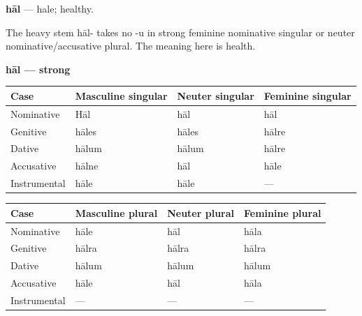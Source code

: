 \par\begin{minipage}{\linewidth}\raggedright
\textbf{hāl} — hale; healthy.

The heavy stem hāl- takes no -u in strong feminine nominative singular or neuter nominative/\allowbreak{}accusative plural. The meaning here is health.

\textbf{hāl — strong}

\par\begingroup
\fontsize{10.5}{13.2}\selectfont
\setlength{\LTleft}{0pt}\setlength{\LTright}{\fill}
\noindent
\begin{tabular}{@{}>{\raggedright\arraybackslash}p{22.0mm}>{\raggedright\arraybackslash}p{31.188mm}>{\raggedright\arraybackslash}p{31.188mm}>{\raggedright\arraybackslash}p{31.188mm}@{}}
\toprule
\textbf{Case} & \textbf{Masculine singular} & \textbf{Neuter singular} & \textbf{Feminine singular} \\
\midrule
Nominative & Hāl & hāl & hāl \\
Genitive & hāles & hāles & hālre \\
Dative & hālum & hālum & hālre \\
Accusative & hālne & hāl & hāle \\
Instrumental & hāle & hāle & — \\
\bottomrule
\end{tabular}
\par\endgroup
\end{minipage}\par
\par\addvspace{5pt}
\par\begingroup
\fontsize{10.5}{13.2}\selectfont
\setlength{\LTleft}{0pt}\setlength{\LTright}{\fill}
\noindent
\begin{tabular}{@{}>{\raggedright\arraybackslash}p{22.0mm}>{\raggedright\arraybackslash}p{31.188mm}>{\raggedright\arraybackslash}p{31.188mm}>{\raggedright\arraybackslash}p{31.188mm}@{}}
\toprule
\textbf{Case} & \textbf{Masculine plural} & \textbf{Neuter plural} & \textbf{Feminine plural} \\
\midrule
Nominative & hāle & hāl & hāla \\
Genitive & hālra & hālra & hālra \\
Dative & hālum & hālum & hālum \\
Accusative & hāle & hāl & hāla \\
Instrumental & — & — & — \\
\bottomrule
\end{tabular}
\par\endgroup

